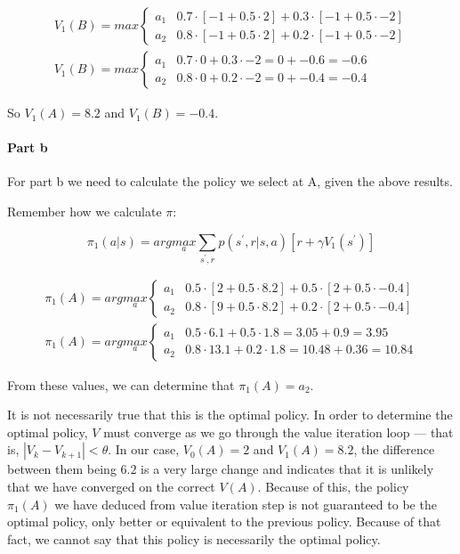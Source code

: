 \documentclass[12pt]{article}
\begin{document}
\begin{gather*}
  V_1(B) = max \begin{cases}
    a_1 & 0.7 \cdot [-1 + 0.5 \cdot 2] + 0.3 \cdot [-1 + 0.5 \cdot -2] \\
    a_2 & 0.8 \cdot [-1 + 0.5 \cdot 2] + 0.2 \cdot [-1 + 0.5 \cdot -2]
  \end{cases} \\
  V_1(B) = max \begin{cases}
    a_1 & 0.7 \cdot 0 + 0.3 \cdot -2 = 0 + -0.6 = -0.6 \\
    a_2 & 0.8 \cdot 0 + 0.2 \cdot -2 = 0 + -0.4 = -0.4
  \end{cases}
\end{gather*}

So $V_1(A) = 8.2$ and $V_1(B) = -0.4$.

\paragraph{Part b} For part b we need to calculate the policy we select at A, given the above results.

Remember how we calculate $\pi$:

$$
  \pi_1(a | s) = arg \underset{a}{max} \sum_{s^\prime, r} p(s^\prime, r | s, a)[r + \gamma V_1(s^\prime)]
$$

\begin{gather*}
  \pi_1(A) = arg \underset{a}{max} \begin{cases}
    a_1 & 0.5 \cdot [2 + 0.5 \cdot 8.2] + 0.5 \cdot [2 + 0.5 \cdot -0.4] \\
    a_2 & 0.8 \cdot [9 + 0.5 \cdot 8.2] + 0.2 \cdot [2 + 0.5 \cdot -0.4]
  \end{cases} \\
  \pi_1(A) = arg \underset{a}{max} \begin{cases}
    a_1 & 0.5 \cdot 6.1 + 0.5 \cdot 1.8  = 3.05 + 0.9 = 3.95    \\
    a_2 & 0.8 \cdot 13.1 + 0.2 \cdot 1.8 = 10.48 + 0.36 = 10.84
  \end{cases}
\end{gather*}

From these values, we can determine that $\pi_1(A) = a_2$.

It is not necessarily true that this is the optimal policy. In order to determine the optimal policy, $V$ must converge as we go through the value iteration loop --- that is, $|V_k - V_{k+1}| < \theta$. In our case, $V_0(A) = 2$ and $V_1(A) = 8.2$, the difference between them being $6.2$ is a very large change and indicates that it is unlikely that we have converged on the correct $V(A)$. Because of this, the policy $\pi_1(A)$ we have deduced from value iteration step is not guaranteed to be the optimal policy, only better or equivalent to the previous policy. Because of that fact, we cannot say that this policy is necessarily the optimal policy.
\end{document}
